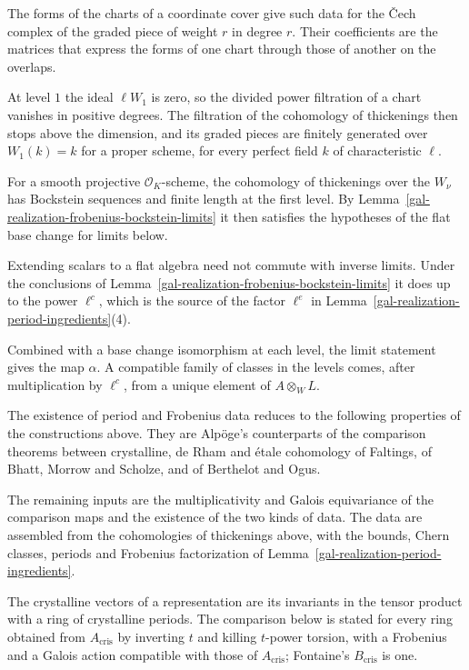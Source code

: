 The forms of the charts of a coordinate cover give such data for the \v{C}ech complex of the graded piece of weight $r$
in degree $r$. Their coefficients are the matrices that express the forms of one chart through those of another on the
overlaps.

At level $1$ the ideal $\ell W_1$ is zero, so the divided power filtration of a chart vanishes in positive degrees. The
filtration of the cohomology of thickenings then stops above the dimension, and its graded pieces are finitely generated
over $W_1(k)=k$ for a proper scheme, for every perfect field $k$ of characteristic $\ell$.

For a smooth projective $\mathcal O_K$-scheme, the cohomology of thickenings over the $W_\nu$ has Bockstein sequences
and finite length at the first level. By Lemma~\ref{gal-realization-frobenius-bockstein-limits} it then satisfies the
hypotheses of the flat base change for limits below.

Extending scalars to a flat algebra need not commute with inverse limits. Under the conclusions of
Lemma~\ref{gal-realization-frobenius-bockstein-limits} it does up to the power $\ell^c$, which is the source of the
factor $\ell^e$ in Lemma~\ref{gal-realization-period-ingredients}(4).

Combined with a base change isomorphism at each level, the limit statement gives the map $\alpha$. A compatible family
of classes in the levels comes, after multiplication by $\ell^c$, from a unique element of $A\otimes_WL$.

The existence of period and Frobenius data reduces to the following properties of the constructions
above. They are Alpöge's counterparts of the comparison theorems between crystalline, de Rham and \'etale
cohomology of Faltings, of Bhatt, Morrow and Scholze, and of Berthelot and Ogus.

The remaining inputs are the multiplicativity and Galois equivariance of the comparison maps and the
existence of the two kinds of data. The data are assembled from the cohomologies of thickenings above,
with the bounds, Chern classes, periods and Frobenius factorization of
Lemma~\ref{gal-realization-period-ingredients}.

The crystalline vectors of a representation are its invariants in the tensor product with a ring of
crystalline periods. The comparison below is stated for every ring obtained from $A_{\mathrm{cris}}$ by
inverting $t$ and killing $t$-power torsion, with a Frobenius and a Galois action compatible with those of
$A_{\mathrm{cris}}$; Fontaine's $B_{\mathrm{cris}}$ is one.

